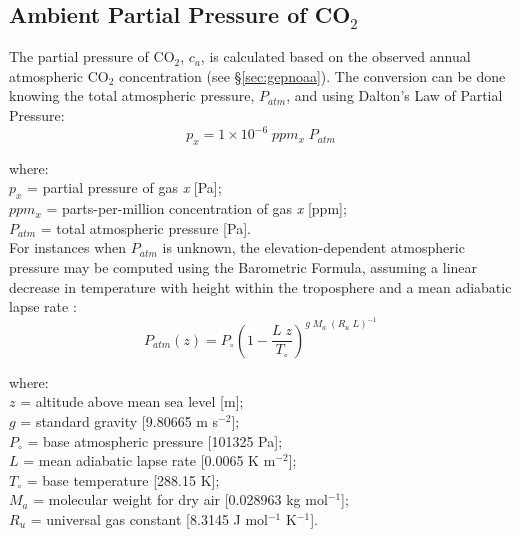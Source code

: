 \documentclass{myreport}
\begin{document}
\subsection{Ambient Partial Pressure of CO$_2$}
\label{sec:ca}
The partial pressure of CO$_2$, $c_a$, is calculated based on the observed annual atmospheric CO$_2$ concentration (see \S \ref{sec:gepnoaa}). 
The conversion can be done knowing the total atmospheric pressure, $P_{atm}$, and using Dalton's Law of Partial Pressure:
\begin{equation}
\label{eq:pp}
    p_x = 1\times 10^{-6}\; ppm_x\; P_{atm}
\end{equation}

\noindent where:\\
\indent $p_x$ = partial pressure of gas \textit{x} [Pa];\\
\indent $ppm_x$ = parts-per-million concentration of gas \textit{x} [ppm];\\
\indent $P_{atm}$ = total atmospheric pressure [Pa].\\

\noindent For instances when $P_{atm}$ is unknown, the elevation-dependent atmospheric pressure may be computed using the Barometric Formula, assuming a linear decrease in temperature with height within the troposphere and a mean adiabatic lapse rate \parencite{berberan97}:
%
\begin{equation}
\label{eq:pz}
    P_{atm}\left( z \right) = P_{\circ} \left( 
    	1 - \frac{L\; z}{T_{\circ}} 
    \right)^{g\; M_a\; \left(R_u\; L\right)^{-1}}
\end{equation}

\noindent where:\\
\indent $z$ = altitude above mean sea level [m];\\
\indent $g$ = standard gravity [9.80665 m s$^{-2}$];\\
\indent $P_{\circ}$ = base atmospheric pressure [101325 Pa];\\
\indent $L$ = mean adiabatic lapse rate [0.0065 K m$^{-2}$];\\
\indent $T_{\circ}$ = base temperature [288.15 K];\\
\indent $M_a$ = molecular weight for dry air [0.028963 kg mol$^{-1}$];\\
\indent $R_u$ = universal gas constant [8.3145 J mol$^{-1}$ K$^{-1}$].\\
\end{document}
